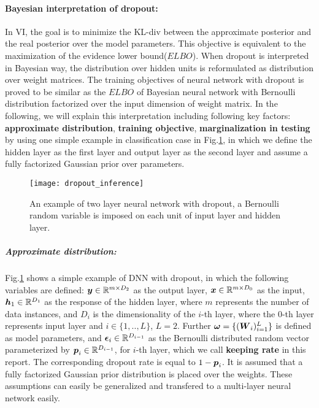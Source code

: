 \paragraph{Bayesian interpretation of dropout:}
In VI, the goal is to minimize the \gls{KL-div} between the approximate posterior and the real posterior over the model parameters. This objective is equivalent to the maximization of the evidence lower bound($ELBO$). When dropout is interpreted in Bayesian way, the distribution over hidden units is reformulated as distribution over weight matrices. The training objectives of neural network with dropout is proved to be similar as the $ELBO$ of Bayesian neural network with Bernoulli distribution factorized over the input dimension of weight matrix. In the following, we will explain this interpretation including following key factors: \textbf{approximate distribution}, \textbf{training objective}, \textbf{marginalization in testing} by using one simple example in {classification} case in Fig.\ref{fig:dropout_inference}, in which we define the hidden layer as the first layer and output layer as the second layer and assume a fully factorized Gaussian prior over parameters.


\begin{figure}[h!]
	\centering
	\texttt{[image: dropout\_inference]}
	\caption{An example of two layer neural network with dropout, a Bernoulli random variable is imposed on each unit of input layer and hidden layer.}	
	\label{fig:dropout_inference}
\end{figure}


\subparagraph{Approximate distribution:}
Fig.\ref{fig:dropout_inference} shows a simple example of DNN with dropout, in which the following variables are defined: %
 $\boldsymbol y\in \mathbb R ^{m \times D_{2}}$ as the output layer, $\boldsymbol x \in \mathbb R^{m \times D_{0}}$ as the input, $\boldsymbol h_{1} \in \mathbb R^{D_{1}}$ as the response of the hidden layer, where $m$ represents the number of data instances, and $D_{i}$ is the dimensionality of the $i$-th layer, where the $0$-th layer represents input layer and $i \in \{1,..,L\}$, $L=2$. Further $\boldsymbol \omega = \{ (\boldsymbol W_{i})_{i=1}^{L}  \}$ is defined as model parameters, and $\boldsymbol \epsilon_{i} \in \mathbb R^{D_{i-1}}$ as the Bernoulli distributed random vector parameterized by $\boldsymbol p_{i} \in \mathbb R^{D_{i-1}}$, for $i$-th layer, which we call \textbf{keeping rate} in this report. The corresponding dropout rate is equal to $1 - \boldsymbol p_i$.
It is assumed that a fully factorized Gaussian prior distribution is placed over the weights. These assumptions can easily be generalized and transfered to a multi-layer neural network easily. 


